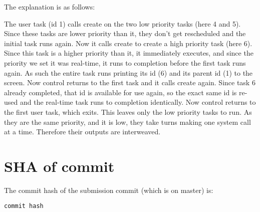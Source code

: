 \documentclass{article}
\begin{document}
The explanation is as follows:

    The user task (id 1) calls create on the two low priority tasks (here 4 and
5).  Since these tasks are lower priority than it, they don't get rescheduled
and the initial task runs again.  Now it calls create to create a high priority
task (here 6).  Since this task is a higher priority than it, it immediately
executes, and since the priority we set it was real-time, it runs to completion
before the first task runs again. As such the entire task runs printing its id
(6) and its parent id (1) to the screen. Now control returns to the first task
and it calls create again. Since task 6 already completed, that id is available
for use again, so the exact same id is re-used and the real-time task runs to
completion identically. Now control returns to the first user task, which exits.
This leaves only the low priority tasks to run. As they are the same priority,
and it is low, they take turns making one system call at a time. Therefore their
outputs are interweaved.

\section{SHA of commit}

The commit hash of the submission commit (which is on master) is:

\texttt{{{{commit hash}}}}
\end{document}
